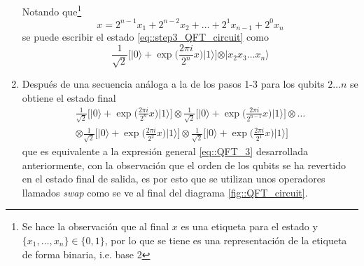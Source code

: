 \documentclass[a4paper]{article}
\begin{document}
\begin{enumerate}
Notando que\footnote{Se hace la observación que al final $x$ es una etiqueta para el estado y $\{x_1,\hdots,x_n\}\in \{0,1\}$, por lo que se tiene es una representación de la etiqueta de forma binaria, i.e. base 2}
\begin{equation}
x=2^{n-1} x_{1}+2^{n-2} x_{2}+\hdots+ 2^{1} x_{n-1}+2^{0} x_{n}
\end{equation}
se puede escribir el estado \ref{eq::step3_QFT_circuit} como 
\begin{equation}
\frac{1}{\sqrt{2}}\bigg[\vert 0\rangle + \exp{\bigg(\frac{2\pi i }{2^n} x\bigg)}\vert 1\rangle\bigg] \otimes \vert x_2 x_3\hdots x_n\rangle
\end{equation}
\item Después de una secuencia análoga a la de los pasos 1-3 para los qubits $2\hdots n$ se obtiene el estado final
\begin{equation}
\begin{aligned}
\frac{1}{\sqrt{2}}\bigg[\vert 0\rangle + \exp{\bigg(\frac{2\pi i }{2^n} x\bigg)}\vert 1\rangle\bigg] \otimes \frac{1}{\sqrt{2}}\bigg[\vert 0\rangle + \exp{\bigg(\frac{2\pi i }{2^{n-1}} x\bigg)}\vert 1\rangle\bigg] \otimes\hdots\\ 
\otimes\frac{1}{\sqrt{2}}\bigg[\vert 0\rangle + \exp{\bigg(\frac{2\pi i }{2^2} x\bigg)}\vert 1\rangle\bigg] \otimes \frac{1}{\sqrt{2}}\bigg[\vert 0\rangle + \exp{\bigg(\frac{2\pi i }{2^1} x\bigg)}\vert 1\rangle\bigg] 
\end{aligned}
\end{equation} 
que es equivalente a la expresión general \ref{eq::QFT_3} desarrollada anteriormente, con la observación que el orden de los qubits se ha revertido en el estado final de salida, es por esto que se utilizan unos operadores llamados \textit{swap} como se ve al final del diagrama \ref{fig::QFT_circuit}.
\end{enumerate}
\end{document}

